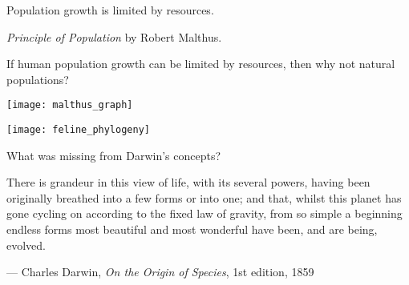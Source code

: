\documentclass[t]{beamer}
\begin{document}
{
\begin{frame}[t]{Population growth is limited by resources.}
	
	\begin{multicols}{2}
		
		\hangpara \textit{Principle of Population} by Robert Malthus.
		
		\hangpara If human population growth can be limited by resources, then why not natural populations?
		
		\columnbreak
		
		\centering
		\texttt{[image: malthus\_graph]}
		
	\end{multicols}
	
\end{frame}
}

{
\begin{frame}[t]{}
\end{frame}
}


{
\begin{frame}[t]{}
\end{frame}
}

\begin{frame}
\centering
\texttt{[image: feline\_phylogeny]} %
\vfilll
\end{frame}

{
	\begin{frame}[t]{}
\end{frame}
}

\begin{frame}[t]{What was missing from Darwin's concepts?}
\vspace{-\baselineskip}
\begin{multicols}{2}
\bigskip


\vfilll

\columnbreak

There is grandeur in this view of life, with its several powers, having been originally breathed into a few forms or into one; and that, whilst this planet has gone cycling on according to the fixed law of gravity, from so simple a beginning endless forms most beautiful and most wonderful have been, and are being, evolved.
	
\vspace{\baselineskip}
	
— Charles Darwin, \textit{On the Origin of Species}, 1st edition, 1859
	
	
\end{multicols}
\end{frame}
\end{document}

